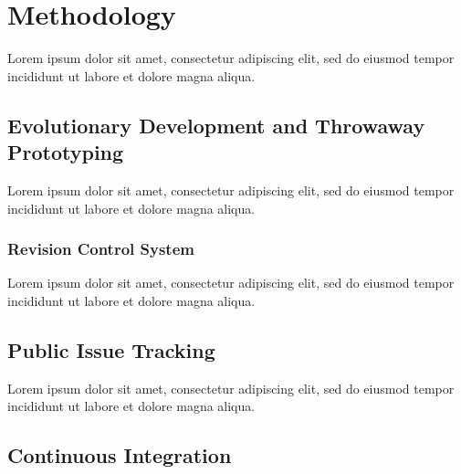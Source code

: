 \documentclass[12pt, a4paper]{article}
\begin{document}

\section{Methodology}

Lorem ipsum dolor sit amet, consectetur adipiscing elit, sed do eiusmod tempor incididunt ut labore et dolore magna aliqua.



\subsection{Evolutionary Development and Throwaway Prototyping}

Lorem ipsum dolor sit amet, consectetur adipiscing elit, sed do eiusmod tempor incididunt ut labore et dolore magna aliqua.


\subsubsection{Revision Control System}

Lorem ipsum dolor sit amet, consectetur adipiscing elit, sed do eiusmod tempor incididunt ut labore et dolore magna aliqua.


\subsection{Public Issue Tracking}

Lorem ipsum dolor sit amet, consectetur adipiscing elit, sed do eiusmod tempor incididunt ut labore et dolore magna aliqua.


\subsection{Continuous Integration}
\end{document}
